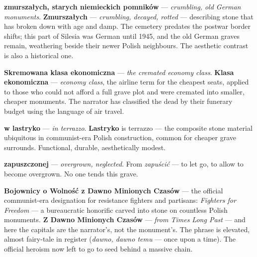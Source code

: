 \textbf{zmurszałych, starych niemieckich pomników} --- \textit{crumbling,
old German monuments}. \textbf{Zmurszałych} --- \textit{crumbling,
decayed, rotted} --- describing stone that has broken down with age
and damp. The cemetery predates the postwar border shifts; this part
of Silesia was German until 1945, and the old German graves remain,
weathering beside their newer Polish neighbours. The aesthetic contrast
is also a historical one.



\textbf{Skremowana klasa ekonomiczna} --- \textit{the cremated economy
class}. \textbf{Klasa ekonomiczna} --- \textit{economy class}, the
airline term for the cheapest seats, applied to those who could not
afford a full grave plot and were cremated into smaller, cheaper
monuments. The narrator has classified the dead by their funerary
budget using the language of air travel.

\textbf{w lastryko} --- \textit{in terrazzo}. \textbf{Lastryko} is
terrazzo --- the composite stone material ubiquitous in communist-era
Polish construction, common for cheaper grave surrounds. Functional,
durable, aesthetically modest.

\textbf{zapuszczonej} --- \textit{overgrown, neglected}. From
\textit{zapuścić} --- to let go, to allow to become overgrown. No one
tends this grave.

\textbf{Bojownicy o Wolność z Dawno Minionych Czasów} --- the official
communist-era designation for resistance fighters and partisans:
\textit{Fighters for Freedom} --- a bureaucratic honorific carved into
stone on countless Polish monuments. \textbf{Z Dawno Minionych Czasów}
--- \textit{from Times Long Past} --- and here the capitals are the
narrator's, not the monument's. The phrase is elevated, almost
fairy-tale in register (\textit{dawno, dawno temu} --- once upon a
time). The official heroism now left to go to seed behind a massive
chain.



